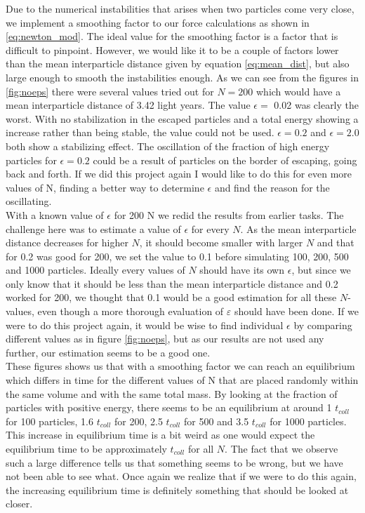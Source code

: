 \documentclass{article}
\begin{document}
Due to the numerical instabilities that arises when two particles come very close, we implement a smoothing factor to our force calculations as shown in \eqref{eq:newton_mod}. The ideal value for the smoothing factor is a factor that is difficult to pinpoint. However, we would like it to be a couple of factors lower than the mean interparticle distance given by equation \eqref{eq:mean_dist}, but also large enough to smooth the instabilities enough. As we can see from the figures in \ref{fig:noeps} there were several values tried out for $N = 200$ which would have a mean interparticle distance of 3.42 light years. The value $\epsilon = $ 0.02 was clearly the worst. With no stabilization in the escaped particles and a total energy showing a increase rather than being stable, the value could not be used. $\epsilon = 0.2$ and $\epsilon = 2.0$ both show a stabilizing effect. The oscillation of the fraction of high energy particles for $\epsilon = 0.2$ could be a result of particles on the border of escaping, going back and forth. If we did this project again I would like to do this for even more values of N, finding a better way to determine $\epsilon$ and find the reason for the oscillating. \\
With a known value of $\epsilon$ for 200 N we redid the results from earlier tasks. The challenge here was to estimate a value of $\epsilon$ for every $N$. As the mean interparticle distance decreases for higher $N$, it should become smaller with larger $N$ and that for 0.2 was good for 200, we set the value to 0.1 before simulating 100, 200, 500 and 1000 particles. Ideally every values of $N$ should have its own $\epsilon$, but since we only know that it should be less than the mean interparticle distance and 0.2 worked for 200, we thought that 0.1 would be a good estimation for all these $N$-values, even though a more thorough evaluation of $\varepsilon$ should have been done. If we were to do this project again, it would be wise to find individual $\epsilon$ by comparing different values as in figure \ref{fig:noeps}, but as our results are not used any further, our estimation seems to be a good one. \\
These figures shows us that with a smoothing factor we can reach an equilibrium which differs in time for the different values of N that are placed randomly within the same volume and with the same total mass. By looking at the fraction of particles with positive energy, there seems to be an equilibrium at around 1 $t_{coll}$ for 100 particles, 1.6 $t_{coll}$ for 200, 2.5 $t_{coll}$ for 500 and 3.5 $t_{coll}$ for 1000 particles. This increase in equilibrium time is a bit weird as one would expect the equilibrium time to be approximately $t_{coll}$ for all $N$. The fact that we observe such a large difference tells us that something seems to be wrong, but we have not been able to see what. Once again we realize that if we were to do this again, the increasing equilibrium time is definitely something that should be looked at closer.\\
\end{document}
